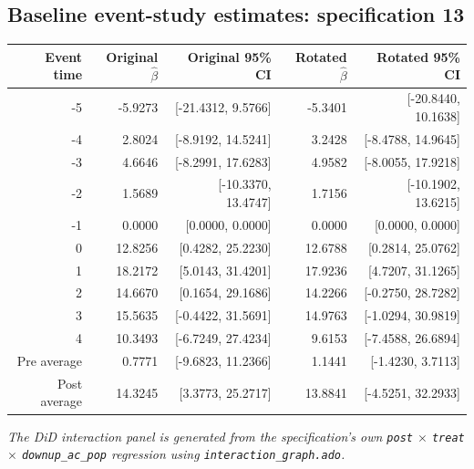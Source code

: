 \documentclass[10pt]{article}
\begin{document}
\subsection*{Baseline event-study estimates: specification 13}
\begin{center}
\scriptsize
\begin{tabular}{r rr rr}
\toprule
Event time & Original $\hat\beta$ & Original 95\% CI & Rotated $\hat\beta$ & Rotated 95\% CI \\
\midrule
-5 & -5.9273 & [-21.4312, 9.5766] & -5.3401 & [-20.8440, 10.1638] \\
-4 & 2.8024 & [-8.9192, 14.5241] & 3.2428 & [-8.4788, 14.9645] \\
-3 & 4.6646 & [-8.2991, 17.6283] & 4.9582 & [-8.0055, 17.9218] \\
-2 & 1.5689 & [-10.3370, 13.4747] & 1.7156 & [-10.1902, 13.6215] \\
-1 & 0.0000 & [0.0000, 0.0000] & 0.0000 & [0.0000, 0.0000] \\
0 & 12.8256 & [0.4282, 25.2230] & 12.6788 & [0.2814, 25.0762] \\
1 & 18.2172 & [5.0143, 31.4201] & 17.9236 & [4.7207, 31.1265] \\
2 & 14.6670 & [0.1654, 29.1686] & 14.2266 & [-0.2750, 28.7282] \\
3 & 15.5635 & [-0.4422, 31.5691] & 14.9763 & [-1.0294, 30.9819] \\
4 & 10.3493 & [-6.7249, 27.4234] & 9.6153 & [-7.4588, 26.6894] \\
\midrule
Pre average & 0.7771 & [-9.6823, 11.2366] & 1.1441 & [-1.4230, 3.7113] \\
Post average & 14.3245 & [3.3773, 25.2717] & 13.8841 & [-4.5251, 32.2933] \\
\bottomrule
\end{tabular}
\end{center}
\medskip
\textit{The DiD interaction panel is generated from the specification's own \texttt{post} $\times$ \texttt{treat} $\times$ \texttt{downup\_ac\_pop} regression using \texttt{interaction\_graph.ado}.}
\clearpage
\end{document}
